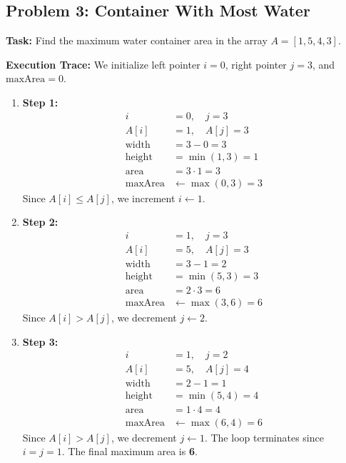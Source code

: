 \documentclass[10pt,journal,compsoc,onecolumn]{IEEEtran}
\begin{document}
\subsection{Problem 3: Container With Most Water}
\textbf{Task:} Find the maximum water container area in the array $A = [1, 5, 4, 3]$.

\textbf{Execution Trace:}
We initialize left pointer $i = 0$, right pointer $j = 3$, and $\text{maxArea} = 0$.
\begin{enumerate}
    \item \textbf{Step 1:}
    \begin{align}
    i &= 0, \quad j = 3 \\
    A[i] &= 1, \quad A[j] = 3 \\
    \text{width} &= 3 - 0 = 3 \\
    \text{height} &= \min(1, 3) = 1 \\
    \text{area} &= 3 \cdot 1 = 3 \\
    \text{maxArea} &\leftarrow \max(0, 3) = 3
    \end{align}
    Since $A[i] \le A[j]$, we increment $i \leftarrow 1$.
    \item \textbf{Step 2:}
    \begin{align}
    i &= 1, \quad j = 3 \\
    A[i] &= 5, \quad A[j] = 3 \\
    \text{width} &= 3 - 1 = 2 \\
    \text{height} &= \min(5, 3) = 3 \\
    \text{area} &= 2 \cdot 3 = 6 \\
    \text{maxArea} &\leftarrow \max(3, 6) = 6
    \end{align}
    Since $A[i] > A[j]$, we decrement $j \leftarrow 2$.
    \item \textbf{Step 3:}
    \begin{align}
    i &= 1, \quad j = 2 \\
    A[i] &= 5, \quad A[j] = 4 \\
    \text{width} &= 2 - 1 = 1 \\
    \text{height} &= \min(5, 4) = 4 \\
    \text{area} &= 1 \cdot 4 = 4 \\
    \text{maxArea} &\leftarrow \max(6, 4) = 6
    \end{align}
    Since $A[i] > A[j]$, we decrement $j \leftarrow 1$.
    The loop terminates since $i = j = 1$. The final maximum area is \textbf{6}.
\end{enumerate}
\end{document}
